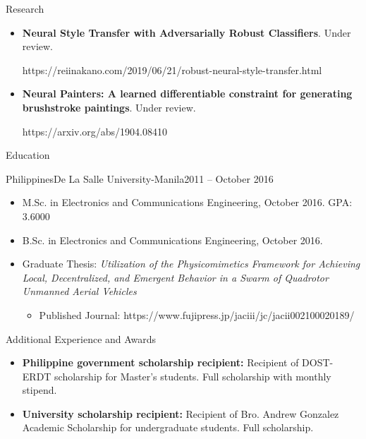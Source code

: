 \documentclass[]{mcdowellcv}
\begin{document}
	\begin{cvsection}{Research}
	   \begin{cvsubsection}{}{}{}
	      \begin{itemize}
    		  \item \textbf{Neural Style Transfer with Adversarially Robust Classifiers}. Under review.
    		    
    		  https://reiinakano.com/2019/06/21/robust-neural-style-transfer.html
	          
	          \item \textbf{Neural Painters: A learned differentiable constraint for generating brushstroke paintings}. Under review.
	          
	          https://arxiv.org/abs/1904.08410
	      \end{itemize}
	   \end{cvsubsection}
	\end{cvsection}
	
	\begin{cvsection}{Education}
		\begin{cvsubsection}{Philippines}{De La Salle University-Manila}{2011 -- October 2016}
			\begin{itemize}
				\item M.Sc. in Electronics and Communications Engineering, October 2016. GPA: 3.6000
				\item B.Sc. in Electronics and Communications Engineering, October 2016.
				\item Graduate Thesis: \textit{Utilization of the Physicomimetics Framework for Achieving Local, Decentralized, and Emergent Behavior in a Swarm of Quadrotor Unmanned Aerial Vehicles}
				\begin{itemize}
				    \item Published Journal: https://www.fujipress.jp/jaciii/jc/jacii002100020189/
				\end{itemize}
			\end{itemize}
		\end{cvsubsection}
	\end{cvsection}
	
	\begin{cvsection}{Additional Experience and Awards}
		\begin{cvsubsection}{}{}{}	
			\begin{itemize}
				\item \textbf{Philippine government scholarship recipient:} Recipient of DOST-ERDT scholarship for Master's students. Full scholarship with monthly stipend.
				\item \textbf{University scholarship recipient:} Recipient of Bro. Andrew Gonzalez Academic Scholarship for undergraduate students. Full scholarship.    
			\end{itemize}
		\end{cvsubsection}
	\end{cvsection}
	
\end{document}
